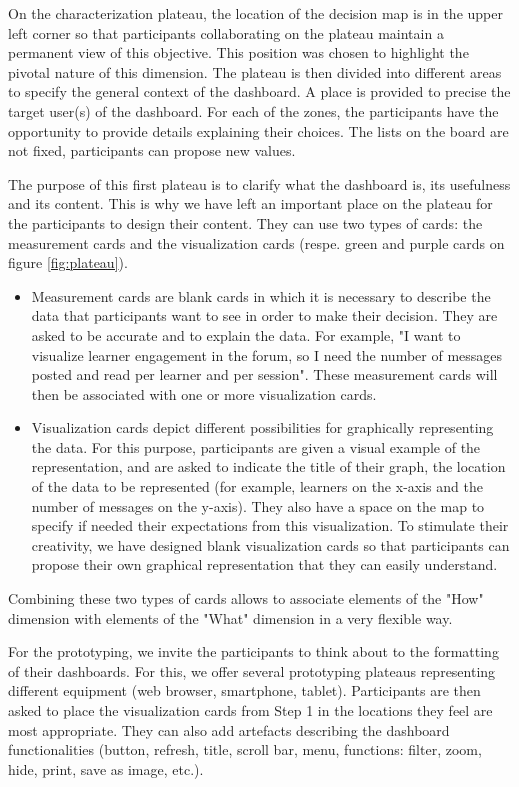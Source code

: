 \documentclass[preprint,12pt]{elsarticle}
\begin{document}
On the characterization plateau, the location of the decision map is in the upper left corner so that participants collaborating on the plateau maintain a permanent view of this objective. This position was chosen to highlight the pivotal nature of this dimension. The plateau is then divided into different areas to specify the general context of the dashboard. A place is provided to precise the target user(s) of the dashboard. For each of the zones, the participants have the opportunity to provide details explaining their choices. The lists on the board are not fixed, participants can propose new values.

The purpose of this first plateau is to clarify what the dashboard is, its usefulness and its content. This is why we have left an important place on the plateau for the participants to design their content. They can use two types of cards: the measurement cards  and the visualization cards (respe. green and purple cards on figure \ref{fig:plateau}).
\begin{itemize}
    \item Measurement cards are blank cards in which it is necessary to describe the data that participants want to see in order to make their decision. They are asked to be accurate and to explain the data. For example, "I want to visualize learner engagement in the forum, so I need the number of messages posted and read per learner and per session". These measurement cards will then be associated with one or more visualization cards.
    \item Visualization cards depict different possibilities for graphically representing the data. For this purpose, participants are given a visual example of the representation, and are asked to indicate the title of their graph, the location of the data to be represented (for example, learners on the x-axis and the number of messages on the y-axis). They also have a space on the map to specify if needed their expectations from this visualization. To stimulate their creativity, we have designed blank visualization cards so that participants can propose their own graphical representation that they can easily understand.
\end{itemize}
Combining these two types of cards allows to associate elements of the "How" dimension with elements of the "What" dimension in a very flexible way.

For the prototyping, we invite the participants to think about to the formatting of their dashboards. For this, we offer several prototyping plateaus representing different equipment (web browser, smartphone, tablet). Participants are then asked to place the visualization cards from Step 1 in the locations they feel are most appropriate. They can also add artefacts describing the dashboard functionalities (button, refresh, title, scroll bar, menu, functions: filter, zoom, hide, print, save as image, etc.).
\end{document}
